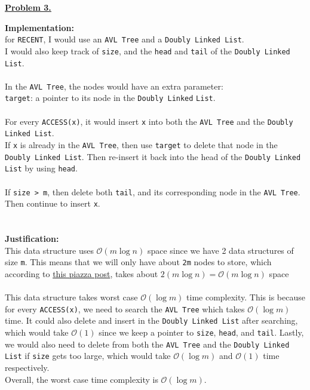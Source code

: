 \documentclass[12pt]{article}
\begin{document}
\newpage
\noindent\hyperlink{toc}{\hypertarget{3}{\LARGE \noindent \underline{\textbf{Problem 3.}}}}
\begin{flushleft}  
\textbf{Implementation:}\\
for \verb|RECENT|, I would use an \verb|AVL Tree| and a \verb|Doubly Linked List|.\\
I would also keep track of \verb|size|, and the \verb|head| and \verb|tail| of the \verb|Doubly Linked List|.
\\\ \\
In the \verb|AVL Tree|, the nodes would have an extra parameter:\\ 
\verb|target|: a pointer to its node in the \verb|Doubly Linked| \verb|List|.
\\\ \\
For every \verb|ACCESS(x)|, it would insert \verb|x| into both the \verb|AVL Tree| and the \verb|Doubly Linked List|.\\
If \verb|x| is already in the \verb|AVL Tree|, then use \verb|target| to delete that node in the \verb|Doubly Linked List|.
Then re-insert it back into the head of the \verb|Doubly Linked List| by using \verb|head|. 
\\\ \\
If \verb|size > m|, then delete both \verb|tail|, and its corresponding node in the \verb|AVL Tree|. Then continue to insert \verb|x|.
\\\ \\\
\\
\textbf{Justification:}\\
This data structure uses $\mathcal{O}(m \log n)$ space since we have 2 data structures of size \verb|m|.
This means that we will only have about \verb|2m| nodes to store, which according to \href{https://piazza.com/class/kju7e2uwa8p3sf?cid=55}{this piazza post},
takes about $2(m \log n) = \mathcal{O}(m \log n)$ space
\\\ \\
This data structure takes worst case $\mathcal{O}(\log m)$ time complexity. This is because for every \verb|ACCESS(x)|,
we need to search the \verb|AVL Tree| which takes $\mathcal{O}(\log m)$ time. It could also delete and insert in the \verb|Doubly Linked List| after searching,
which would take $\mathcal{O}(1)$ since we keep a pointer to \verb|size|, \verb|head|, and \verb|tail|.
Lastly, we would also need to delete from both the \verb|AVL Tree| and the \verb|Doubly Linked List| if \verb|size| gets too large,
which would take $\mathcal{O}(\log m)$ and $\mathcal{O}(1)$ time respectively.\\
Overall, the worst case time complexity is $\mathcal{O}(\log m)$. \end{flushleft}
\end{document}
